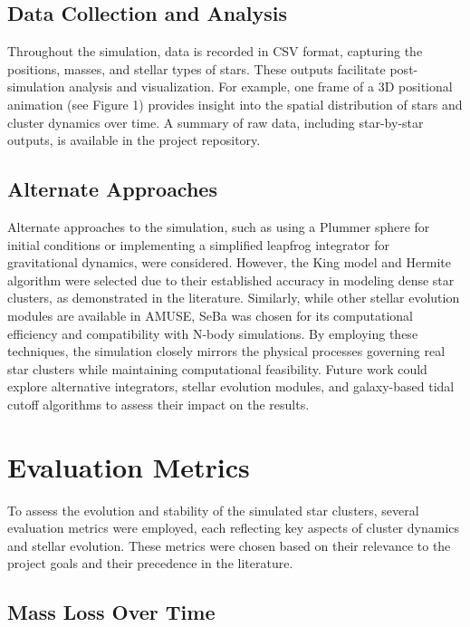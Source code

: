 \documentclass[10pt,twocolumn]{article}
\begin{document}
\subsection{Data Collection and Analysis}

Throughout the simulation, data is recorded in CSV format, capturing the positions, masses, and stellar types of stars. These outputs facilitate post-simulation analysis and visualization. For example, one frame of a 3D positional animation (see Figure 1) provides insight into the spatial distribution of stars and cluster dynamics over time. A summary of raw data, including star-by-star outputs, is available in the project repository.

\subsection{Alternate Approaches}

Alternate approaches to the simulation, such as using a Plummer sphere for initial conditions or implementing a simplified leapfrog integrator for gravitational dynamics, were considered. However, the King model and Hermite algorithm were selected due to their established accuracy in modeling dense star clusters, as demonstrated in the literature. Similarly, while other stellar evolution modules are available in AMUSE, SeBa was chosen for its computational efficiency and compatibility with N-body simulations. By employing these techniques, the simulation closely mirrors the physical processes governing real star clusters while maintaining computational feasibility. Future work could explore alternative integrators, stellar evolution modules, and galaxy-based tidal cutoff algorithms to assess their impact on the results.

\section{Evaluation Metrics}

To assess the evolution and stability of the simulated star clusters, several evaluation metrics were employed, each reflecting key aspects of cluster dynamics and stellar evolution. These metrics were chosen based on their relevance to the project goals and their precedence in the literature.

\subsection{Mass Loss Over Time}
\end{document}
